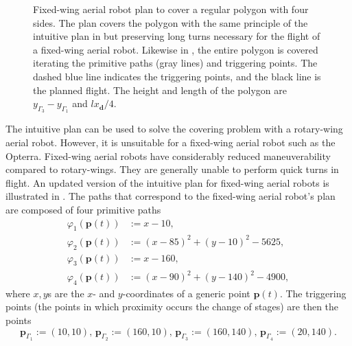 \begin{figure}[p!]
  \centering
  
  \caption[Fixed-wing aerial robot's plan to cover a regular polygon with four sides]{Fixed-wing aerial robot plan to cover a regular polygon with four sides. The plan covers the polygon with the same principle of the intuitive plan in  but preserving long turns necessary for the flight of a fixed-wing aerial robot. Likewise in , the entire polygon is covered iterating the primitive paths (gray lines) and triggering points. The dashed blue line indicates the triggering points, and the black line is the planned flight. The height and length of the polygon are $y_{\Gamma_3}-y_{\Gamma_1}$ and $lx_\mathbf{d}/4$.}
  \label{fig:plot4}
\end{figure}

The intuitive plan can be used to solve the covering problem with a rotary-wing aerial robot. However, it is unsuitable for a fixed-wing aerial robot such as the Opterra. Fixed-wing aerial robots have considerably reduced maneuverability compared to rotary-wings. They are generally unable to perform quick turns in flight. An updated version of the intuitive plan for fixed-wing aerial robots is illustrated in . The paths that correspond to the fixed-wing aerial robot's plan are composed of four primitive paths
\begin{subequations}\label{eq:basic-plan}\begin{align}
\varphi_1(\mathbf{p}(t))&:=x-10,\label{eq:line1}\\
\varphi_2(\mathbf{p}(t))&:=(x-85)^2+(y-10)^2-5625,\label{eq:circ1}\\
\varphi_3(\mathbf{p}(t))&:=x-160,\label{eq:line2}\\
\varphi_4(\mathbf{p}(t))&:=(x-90)^2+(y-140)^2-4900,\label{eq:circ2}\end{align}
\end{subequations}
where $x,y$s are the $x$- and $y$-coordinates of a generic point $\mathbf{p}(t)$. The triggering points (the points in which proximity occurs the change of stages) are then the points
\begin{equation}\label{eq:basic-plan-trigs}
  \mathbf{p}_{\Gamma_1}:=(10,10),\,\mathbf{p}_{\Gamma_2}:=(160,10),\,\mathbf{p}_{\Gamma_3}:=(160,140),\,\mathbf{p}_{\Gamma_4}:=(20,140).
\end{equation}

